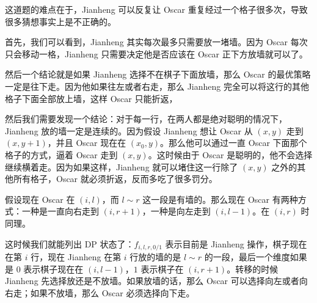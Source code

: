 这道题的难点在于，Jianheng 可以反复让 Oscar 重复经过一个格子很多次，导致很多猜想事实上是不正确的。

首先，我们可以看到，Jianheng 其实每次最多只需要放一堵墙。因为 Oscar 每次只会移动一格，Jianheng 只需要决定他是否应该在 Oscar 正下方放墙就可以了。

然后一个结论就是如果 Jianheng 选择不在棋子下面放墙，那么 Oscar 的最优策略一定是往下走。因为他如果往左或者右走，那么 Jianheng 完全可以将这行的其他格子下面全部放上墙，这样 Oscar 只能折返，

然后我们需要发现一个结论：对于每一行，在两人都是绝对聪明的情况下，Jianheng 放的墙一定是连续的。因为假设 Jianheng 想让 Oscar 从 $(x, y)$ 走到 $(x, y+1)$，并且 Oscar 现在在 $(x_0, y)$。那么他可以通过一直 Oscar 下面那个格子的方式，逼着 Oscar 走到 $(x, y)$。这时候由于 Oscar 是聪明的，他不会选择继续横着走。因为如果这样，Jianheng 就可以堵住这一行除了 $(x, y)$ 之外的其他所有格子，Oscar 就必须折返，反而多吃了很多罚分。

假设现在 Oscar 在 $(i, l)$，而 $l\sim r$ 这一段是有墙的。那么现在 Oscar 有两种方式：一种是一直向右走到 $(i, r+1)$，一种是向左走到 $(i, l-1)$。在 $(i, r)$ 时同理。

这时候我们就能列出 DP 状态了：$f_{i, l, r, 0/1}$ 表示目前是 Jianheng 操作，棋子现在在第 $i$ 行，现在 Jianheng 在第 $i$ 行放的墙的是 $l\sim r$ 的一段，最后一个维度如果是 $0$ 表示棋子现在在 $(i, l-1)$，$1$ 表示棋子在 $(i, r+1)$。转移的时候 Jianheng 先选择放还是不放墙。如果放墙的话，那么 Oscar 可以选择向左或者向右走；如果不放墙，那么 Oscar 必须选择向下走。
